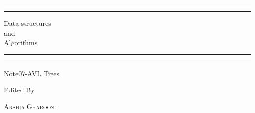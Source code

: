 \documentclass[a4paper, 11pt, oneside]{book} %
\begin{document}
 

\begin{titlepage} %

	\centering %
	
	\scshape %
	
	\vspace*{\baselineskip} %
	
	
	\rule{\textwidth}{1.6pt}\vspace*{-\baselineskip}\vspace*{2pt} %
	\rule{\textwidth}{0.4pt} %
	
	\vspace{0.75\baselineskip} %
	
	{\LARGE Data structures\\ and\\ Algorithms\\} %
	
	\vspace{0.75\baselineskip} %
	
	\rule{\textwidth}{0.4pt}\vspace*{-\baselineskip}\vspace{3.2pt} %
	\rule{\textwidth}{1.6pt} %
	
	\vspace{2\baselineskip} %
	
	
	Note07-AVL Trees %
	
	\vspace*{3\baselineskip} %
	
	
	Edited By
	
	\vspace{0.5\baselineskip} %
	
	{\scshape\Large Arshia Gharooni \\} %
	

\end{titlepage}
\end{document}
